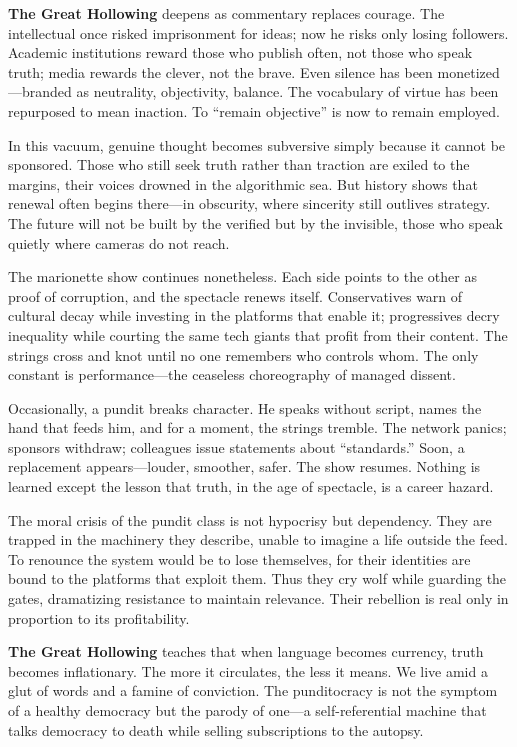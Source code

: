 \documentclass[11pt,twoside]{book}
\begin{document}
\textbf{The Great Hollowing} deepens as commentary replaces courage.  
The intellectual once risked imprisonment for ideas; now he risks only losing followers.  
Academic institutions reward those who publish often, not those who speak truth; media rewards the clever, not the brave.  
Even silence has been monetized—branded as neutrality, objectivity, balance.  
The vocabulary of virtue has been repurposed to mean inaction.  
To “remain objective” is now to remain employed.

In this vacuum, genuine thought becomes subversive simply because it cannot be sponsored.  
Those who still seek truth rather than traction are exiled to the margins, their voices drowned in the algorithmic sea.  
But history shows that renewal often begins there—in obscurity, where sincerity still outlives strategy.  
The future will not be built by the verified but by the invisible, those who speak quietly where cameras do not reach.

The marionette show continues nonetheless.  
Each side points to the other as proof of corruption, and the spectacle renews itself.  
Conservatives warn of cultural decay while investing in the platforms that enable it; progressives decry inequality while courting the same tech giants that profit from their content.  
The strings cross and knot until no one remembers who controls whom.  
The only constant is performance—the ceaseless choreography of managed dissent.

Occasionally, a pundit breaks character.  
He speaks without script, names the hand that feeds him, and for a moment, the strings tremble.  
The network panics; sponsors withdraw; colleagues issue statements about “standards.”  
Soon, a replacement appears—louder, smoother, safer.  
The show resumes.  
Nothing is learned except the lesson that truth, in the age of spectacle, is a career hazard.

The moral crisis of the pundit class is not hypocrisy but dependency.  
They are trapped in the machinery they describe, unable to imagine a life outside the feed.  
To renounce the system would be to lose themselves, for their identities are bound to the platforms that exploit them.  
Thus they cry wolf while guarding the gates, dramatizing resistance to maintain relevance.  
Their rebellion is real only in proportion to its profitability.

\textbf{The Great Hollowing} teaches that when language becomes currency, truth becomes inflationary.  
The more it circulates, the less it means.  
We live amid a glut of words and a famine of conviction.  
The punditocracy is not the symptom of a healthy democracy but the parody of one—a self-referential machine that talks democracy to death while selling subscriptions to the autopsy.
\end{document}
